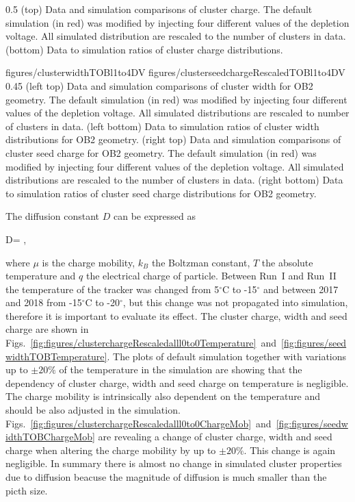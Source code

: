                  {0.5}       %
                 { (top) Data and simulation comparisons of cluster charge. The default simulation (in red) was modified by injecting four different values of the depletion voltage. All simulated distribution are rescaled to the number of clusters in data. (bottom) Data to simulation ratios of cluster charge distributions. }

                 {figures/clusterwidthTOBl1to4DV}
                 {figures/clusterseedchargeRescaledTOBl1to4DV} %
                 {0.45}       %
                 {(left top) Data and simulation  comparisons of cluster width for OB2 geometry. The default simulation (in red) was modified by injecting four different values of the depletion voltage. All simulated distributions are rescaled to number of clusters in data. (left bottom) Data to simulation ratios of cluster width distributions for OB2 geometry. (right top) Data and simulation  comparisons of cluster seed charge for OB2 geometry. The default simulation (in red) was modified by injecting four different values of the depletion voltage. All simulated distributions are rescaled to the number of clusters in data. (right bottom) Data to simulation ratios of cluster seed charge distributions for OB2 geometry. }

The diffusion constant $D$ can be expressed as

{
   D=  ,
}

where $\mu$ is the charge mobility, $k_{B}$ the Boltzman constant, $T$ the absolute temperature and $q$ the electrical charge of particle. Between Run~I and Run~II the temperature of the tracker was changed from 5$^{\circ}$C to -15$^{\circ}$ and between 2017 and 2018 from -15$^{\circ}$C to -20$^{\circ}$, but this change was not propagated into simulation, therefore it is important to evaluate its effect. The cluster charge, width and seed charge are shown in Figs.~\ref{fig:figures/clusterchargeRescaledalll0to0Temperature}~and~\ref{fig:figures/seedwidthTOBTemperature}. The plots of default simulation together with variations up to $\pm 20\%$ of the temperature in the simulation are showing that the dependency of cluster charge, width and seed charge on temperature is negligible. The charge mobility is intrinsically also dependent on the temperature and should be also adjusted in the simulation. Figs.~\ref{fig:figures/clusterchargeRescaledalll0to0ChargeMob}~and~\ref{fig:figures/seedwidthTOBChargeMob} are revealing a change of cluster charge, width and seed charge when altering the charge mobility by up to $\pm 20\%$. This change is again negligible. In summary there is almost no change in simulated cluster properties due to diffusion beacuse the magnitude of diffusion is much smaller than the picth size.


